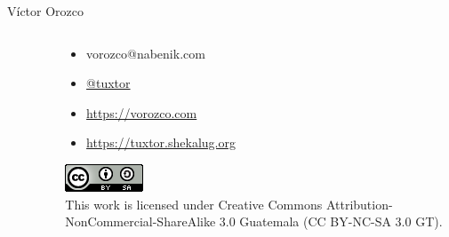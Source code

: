 \documentclass[aspectratio=169]{beamer}
\begin{document}
\begin{frame}{Víctor Orozco}
\begin{columns}[T]
\begin{column}[T]{4cm}
\begin{figure}
            \end{figure}
        \end{column}
        \begin{column}[T]{6cm} %
            \begin{itemize}
                \item vorozco@nabenik.com
                \item \href{https://twitter.com/tuxtor}{@tuxtor}
                \item \href{https://vorozco.com}{https://vorozco.com}
                \item \href{https://tuxtor.shekalug.org}{https://tuxtor.shekalug.org}
            \end{itemize}
            \begin{center}
                \includegraphics[width=0.1\linewidth]{Images/cclogo}
                \\
                This work is licensed under Creative Commons Attribution-NonCommercial-ShareAlike 3.0 Guatemala (CC BY-NC-SA 3.0 GT).
            \end{center}
        \end{column}
    \end{columns}
\end{frame}
{
    \begin{frame}
    \end{frame}
}
\end{document}
